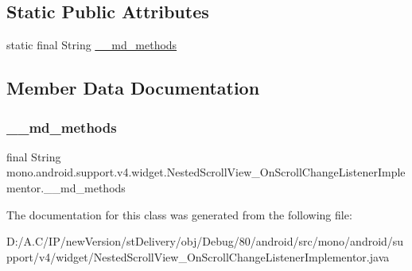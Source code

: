 \subsection*{Static Public Attributes}
\begin{DoxyCompactItemize}
\item 
static final String \hyperlink{classmono_1_1android_1_1support_1_1v4_1_1widget_1_1_nested_scroll_view___on_scroll_change_listener_implementor_aff89a2aa68d424dc98599788cbf43767}{\+\_\+\+\_\+md\+\_\+methods}
\end{DoxyCompactItemize}


\subsection{Member Data Documentation}
\mbox{\label{classmono_1_1android_1_1support_1_1v4_1_1widget_1_1_nested_scroll_view___on_scroll_change_listener_implementor_aff89a2aa68d424dc98599788cbf43767}} 
\subsubsection{\texorpdfstring{\+\_\+\+\_\+md\+\_\+methods}{\_\_md\_methods}}
{\footnotesize\ttfamily final String mono.\+android.\+support.\+v4.\+widget.\+Nested\+Scroll\+View\+\_\+\+On\+Scroll\+Change\+Listener\+Implementor.\+\_\+\+\_\+md\+\_\+methods\hspace{0.3cm}{\ttfamily [static]}}



The documentation for this class was generated from the following file\+:\begin{DoxyCompactItemize}
\item 
D\+:/\+A.\+C/\+I\+P/new\+Version/st\+Delivery/obj/\+Debug/80/android/src/mono/android/support/v4/widget/Nested\+Scroll\+View\+\_\+\+On\+Scroll\+Change\+Listener\+Implementor.\+java\end{DoxyCompactItemize}
